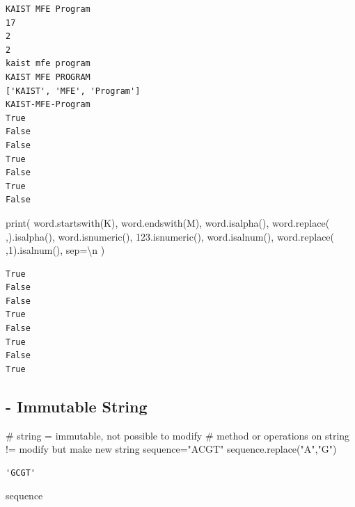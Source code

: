 \documentclass[
  letterpaper,
  DIV=11,
  numbers=noendperiod]{scrreprt}
\newenvironment{Shaded}{\begin{snugshade}}{\end{snugshade}}
\newcommand{\BuiltInTok}[1]{\textcolor[rgb]{0.00,0.23,0.31}{#1}}
\newcommand{\CharTok}[1]{\textcolor[rgb]{0.13,0.47,0.30}{#1}}
\newcommand{\CommentTok}[1]{\textcolor[rgb]{0.37,0.37,0.37}{#1}}
\newcommand{\NormalTok}[1]{\textcolor[rgb]{0.00,0.23,0.31}{#1}}
\newcommand{\OperatorTok}[1]{\textcolor[rgb]{0.37,0.37,0.37}{#1}}
\newcommand{\StringTok}[1]{\textcolor[rgb]{0.13,0.47,0.30}{#1}}
\begin{document}
\begin{verbatim}
KAIST MFE Program
17
2
2
kaist mfe program
KAIST MFE PROGRAM
['KAIST', 'MFE', 'Program']
KAIST-MFE-Program
True
False
False
True
False
True
False
\end{verbatim}

\begin{Shaded}
\begin{Highlighting}[]
\BuiltInTok{print}\NormalTok{(}
\NormalTok{    word.startswith(}\StringTok{\textquotesingle{}K\textquotesingle{}}\NormalTok{),}
\NormalTok{    word.endswith(}\StringTok{\textquotesingle{}M\textquotesingle{}}\NormalTok{),}
\NormalTok{    word.isalpha(),}
\NormalTok{    word.replace(}\StringTok{\textquotesingle{} \textquotesingle{}}\NormalTok{,}\StringTok{\textquotesingle{}\textquotesingle{}}\NormalTok{).isalpha(),}
\NormalTok{    word.isnumeric(),}
    \StringTok{\textquotesingle{}123\textquotesingle{}}\NormalTok{.isnumeric(),}
\NormalTok{    word.isalnum(),}
\NormalTok{    word.replace(}\StringTok{\textquotesingle{} \textquotesingle{}}\NormalTok{,}\StringTok{\textquotesingle{}1\textquotesingle{}}\NormalTok{).isalnum(),}
\NormalTok{    sep}\OperatorTok{=}\StringTok{\textquotesingle{}}\CharTok{\textbackslash{}n}\StringTok{\textquotesingle{}}
\NormalTok{)}
\end{Highlighting}
\end{Shaded}

\begin{verbatim}
True
False
False
True
False
True
False
True
\end{verbatim}

\subsection{- Immutable String}\label{immutable-string}

\begin{Shaded}
\begin{Highlighting}[]
\CommentTok{\# string = immutable, not possible to modify}
\CommentTok{\# method or operations on string != modify but make new string}
\NormalTok{sequence}\OperatorTok{=}\StringTok{"ACGT"}
\NormalTok{sequence.replace(}\StringTok{"A"}\NormalTok{,}\StringTok{"G"}\NormalTok{)}
\end{Highlighting}
\end{Shaded}

\begin{verbatim}
'GCGT'
\end{verbatim}

\begin{Shaded}
\begin{Highlighting}[]
\NormalTok{sequence}
\end{Highlighting}
\end{Shaded}
\end{document}
